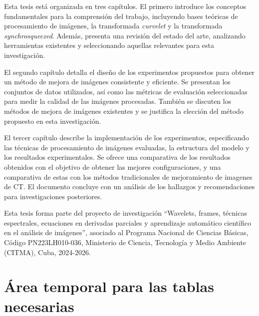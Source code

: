 Esta tesis está organizada en tres capítulos. El primero introduce los conceptos fundamentales para la comprensión del trabajo, incluyendo bases teóricas de procesamiento de imágenes, la transformada \emph{curvelet} y la transformada \emph{synchrosqueezed}. Además, presenta una revisión del estado del arte, analizando herramientas existentes y seleccionando aquellas relevantes para esta investigación.

El segundo capítulo detalla el diseño de los experimentos propuestos para obtener un método de mejora de imágenes consistente y eficiente. Se presentan los conjuntos de datos utilizados, así como las métricas de evaluación seleccionadas para medir la calidad de las imágenes procesadas. También se discuten los métodos de mejora de imágenes existentes y se justifica la elección del método propuesto en esta investigación.

El tercer capítulo describe la implementación de los experimentos, especificando las técnicas de procesamiento de imágenes evaluadas, la estructura del modelo y los resultados experimentales. Se ofrece una comparativa de los resultados obtenidos con el objetivo de obtener las mejores configuraciones, y una comparativa de estas con los métodos tradicionales de mejoramiento de imagenes de CT. El documento concluye con un análisis de los hallazgos y recomendaciones para investigaciones posteriores.

Esta tesis forma parte del proyecto de investigación ``Wavelets, frames, técnicas espectrales, ecuaciones en derivadas parciales y aprendizaje automático científico en el análisis de imágenes'', asociado al Programa Nacional de Ciencias Básicas, Código PN223LH010-036, Ministerio de Ciencia, Tecnología y Medio Ambiente (CITMA), Cuba, 2024-2026.

\section*{Área temporal para las tablas necesarias}

